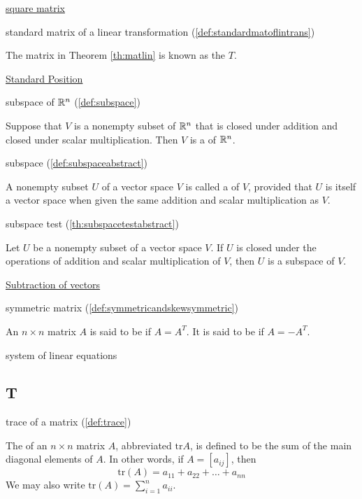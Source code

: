\documentclass{ximera}
\begin{document}
\href{https://ximera.osu.edu/oerlinalg/LinearAlgebra/MAT-0010/main}{square matrix}

standard matrix of a linear transformation (\ref{def:standardmatoflintrans})
\begin{expandable}
    The matrix in Theorem \ref{th:matlin} is known as the  $T$.
\end{expandable}

\href{https://ximera.osu.edu/oerlinalg/LinearAlgebra/VEC-0010/main}{Standard Position}

subspace of $\mathbb{R}^n$ (\ref{def:subspace})
\begin{expandable}
    Suppose that $V$ is a nonempty subset of $\mathbb{R}^n$ that is closed under addition and closed under scalar multiplication.  Then $V$ is a  of $\mathbb{R}^n$.
\end{expandable}

subspace (\ref{def:subspaceabstract})
\begin{expandable}
    A nonempty subset $U$ of a vector space $V$ is called a  of $V$, provided that $U$ is itself a vector space when given the same addition and scalar multiplication as $V$.
\end{expandable}

subspace test (\ref{th:subspacetestabstract})
\begin{expandable}
    Let $U$ be a nonempty subset of a vector space $V$.  If $U$ is closed under the operations of addition and scalar multiplication of $V$, then $U$ is a subspace of $V$.
\end{expandable}

\href{https://ximera.osu.edu/oerlinalg/LinearAlgebra/VEC-0030/main}{Subtraction of vectors}

symmetric matrix (\ref{def:symmetricandskewsymmetric})
\begin{expandable}
    An $n\times n$ matrix $A$ is said to be
 if $A=A^{T}.$ It is said to be
 if $A=-A^{T}.$
\end{expandable}

system of linear equations



\subsection{T}

trace of a matrix (\ref{def:trace})
\begin{expandable}
    The  of an $n \times n$ matrix $A$, abbreviated $\mbox{tr} A$, is defined to be the sum of the main diagonal elements of $A$.  In other words, if $ A = [a_{ij}]$, then $$\mbox{tr}(A) = a_{11} + a_{22} + \dots + a_{nn}$$  We may also write $\mbox{tr}(A) =\sum_{i=1}^n a_{ii}$.
\end{expandable}
\end{document}
